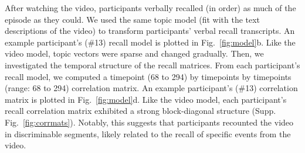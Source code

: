 \documentclass{article}
\begin{document}
After watching the video, participants verbally recalled (in order) as much of the episode as they could.  We used the same topic model (fit with the text descriptions of the video) to transform participants' verbal recall transcripts. An example participant's (\#13) recall model is plotted in Fig.~\ref{fig:model}b. Like the video model, topic vectors were sparse and changed gradually.  Then, we investigated the temporal structure of the recall matrices. From each participant's recall model, we computed a timepoint (68 to 294) by timepoints by timepoints (range: 68 to 294) correlation matrix. An example participant's (\#13) correlation matrix is plotted in Fig.~\ref{fig:model}d. Like the video model, each participant's recall correlation matrix exhibited a strong block-diagonal structure (Supp. Fig.~\ref{fig:corrmats}). Notably, this suggests that participants recounted the video in discriminable segments, likely related to the recall of specific events from the video.
\end{document}
